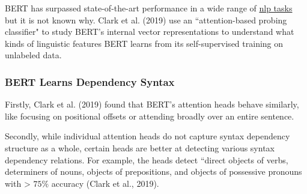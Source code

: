 {BERT has surpassed state-of-the-art performance in a wide range of \hyperref[app:Appendix_NLPTasks]{nlp tasks} but it is not known why. Clark et al. (2019) use an ``attention-based probing classifier" to study BERT's internal vector representations to understand what kinds of linguistic features BERT learns from its self-supervised training on unlabeled data. 




\subsubsection{BERT Learns Dependency Syntax} \label{sec:BERTLearnsSyntax}

Firstly, Clark et al. (2019) found that BERT's attention heads behave similarly, like focusing on positional offsets or attending broadly over an entire sentence. 

}


Secondly, while individual attention heads do not capture syntax dependency structure as a whole, certain heads are better at detecting various syntax dependency relations. For example, the heads detect ``direct objects of verbs, determiners of nouns, objects of prepositions, and objects of possessive pronouns with > $75 \%$ accuracy (Clark et al., 2019). 



